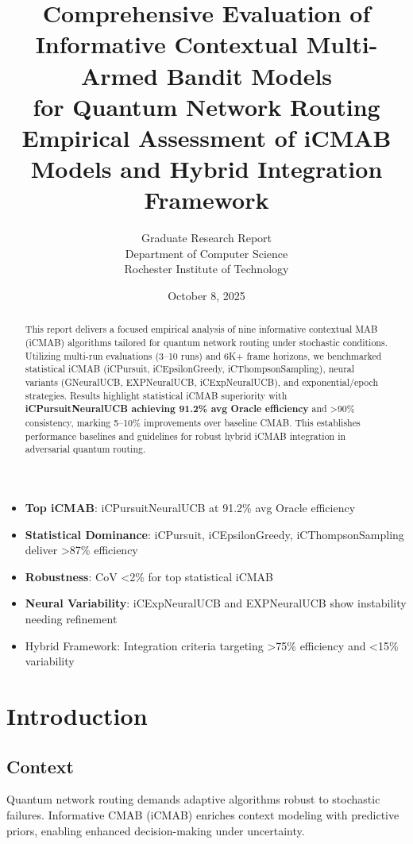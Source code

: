 \documentclass[12pt,a4paper]{article}
\title{\textbf{Comprehensive Evaluation of Informative Contextual Multi-Armed Bandit Models\\for Quantum Network Routing}\\
\large{Empirical Assessment of iCMAB Models and Hybrid Integration Framework}}
\author{Graduate Research Report\\Department of Computer Science\\Rochester Institute of Technology}
\date{October 8, 2025}
\newcommand{\primary}[1]{\textcolor{primaryblue}{\textbf{#1}}}
\newcommand{\secondary}[1]{\textcolor{secondaryblue}{\textbf{#1}}}
\newcommand{\success}[1]{\textcolor{accentgreen}{\textbf{#1}}}
\newcommand{\warning}[1]{\textcolor{warningred}{\textbf{#1}}}
\newcommand{\highlight}[1]{\colorbox{highlightgray}{#1}}
\begin{document}
\maketitle

\begin{abstract}
This report delivers a focused empirical analysis of nine informative contextual MAB (iCMAB) algorithms tailored for quantum network routing under stochastic conditions. Utilizing multi-run evaluations (3–10 runs) and 6K+ frame horizons, we benchmarked statistical iCMAB (iCPursuit, iCEpsilonGreedy, iCThompsonSampling), neural variants (GNeuralUCB, EXPNeuralUCB, iCExpNeuralUCB), and exponential/epoch strategies. Results highlight statistical iCMAB superiority with \primary{iCPursuitNeuralUCB achieving 91.2\% avg Oracle efficiency} and >90\% consistency, marking 5–10\% improvements over baseline CMAB. This establishes performance baselines and guidelines for robust hybrid iCMAB integration in adversarial quantum routing.
\end{abstract}

\vspace{0.5cm}
\tableofcontents
\newpage

\begin{tcolorbox}[colback=highlightgray,colframe=primaryblue,title=\textbf{Executive Summary}]
\begin{itemize}
\item \primary{Top iCMAB}: iCPursuitNeuralUCB at 91.2\% avg Oracle efficiency
\item \secondary{Statistical Dominance}: iCPursuit, iCEpsilonGreedy, iCThompsonSampling deliver >87\% efficiency
\item \success{Robustness}: CoV <2\% for top statistical iCMAB
\item \warning{Neural Variability}: iCExpNeuralUCB and EXPNeuralUCB show instability needing refinement
\item \highlight{Hybrid Framework}: Integration criteria targeting >75\% efficiency and <15\% variability
\end{itemize}
\end{tcolorbox}

\section{Introduction}
\subsection{Context}
Quantum network routing demands adaptive algorithms robust to stochastic failures. Informative CMAB (iCMAB) enriches context modeling with predictive priors, enabling enhanced decision-making under uncertainty.
\end{document}
